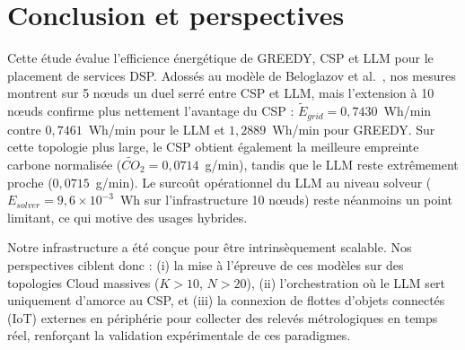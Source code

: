 ﻿\documentclass[systeme]{compas2026}
\begin{document}
\section{Conclusion et perspectives}
\label{sec:conclusion}

Cette étude évalue l'efficience énergétique de GREEDY, CSP et LLM pour le placement de services DSP. Adossés au modèle de Beloglazov et al.~\cite{beloglazov2012energy}, nos mesures montrent sur 5 nœuds un duel serré entre CSP et LLM, mais l'extension à 10 nœuds confirme plus nettement l'avantage du CSP : $\widetilde{E}_{grid}=0{,}7430$~Wh/min contre $0{,}7461$~Wh/min pour le LLM et $1{,}2889$~Wh/min pour GREEDY. Sur cette topologie plus large, le CSP obtient également la meilleure empreinte carbone normalisée ($\widetilde{CO}_2=0{,}0714$~g/min), tandis que le LLM reste extrêmement proche ($0{,}0715$~g/min). Le surcoût opérationnel du LLM au niveau solveur ($E_{solver}=9{,}6\times10^{-3}$~Wh sur l'infrastructure 10 nœuds) reste néanmoins un point limitant, ce qui motive des usages hybrides.

Notre infrastructure a été conçue pour être intrinsèquement scalable. Nos perspectives ciblent donc : (i) la mise à l'épreuve de ces modèles sur des topologies Cloud massives ($K > 10$, $N > 20$), (ii) l'orchestration où le LLM sert uniquement d'amorce au CSP, et (iii) la connexion de flottes d'objets connectés (IoT) externes en périphérie pour collecter des relevés métrologiques en temps réel, renforçant la validation expérimentale de ces paradigmes.


\end{document}
